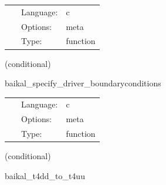\hspace{5mm}

 \begin{tabular*}{160mm}{cll} 
~ & Language:  & c \\ 
~ & Options:  & meta \\ 
~ & Type:  & function \\ 
\end{tabular*} 


\vspace{5mm}

   (conditional) 

\hspace{5mm} baikal\_specify\_driver\_boundaryconditions 

\hspace{5mm}{\it register boundary conditions in presync bin driver\_boundaryselect. } 


\hspace{5mm}

 \begin{tabular*}{160mm}{cll} 
~ & Language:  & c \\ 
~ & Options:  & meta \\ 
~ & Type:  & function \\ 
\end{tabular*} 


\vspace{5mm}

   (conditional) 

\hspace{5mm} baikal\_t4dd\_to\_t4uu 

\hspace{5mm}{\it compute t4uu from t4dd (provided in et?? from tmunubase), needed for bssn rhss } 


\hspace{5mm}


